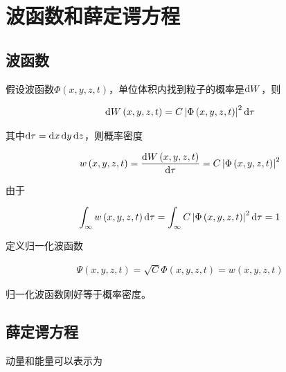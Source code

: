 \section{波函数和薛定谔方程}

\subsection{波函数}

假设波函数$\Phi(x,y,z,t)$，单位体积内找到粒子的概率是$\mathop{}\!\mathrm{d} W$，则

\begin{equation*}
  \begin{aligned}
    \mathop{}\!\mathrm{d} W \left( x, y, z, t \right) = C \left| \Phi \left( x, y, z, t \right) \right|^2 \mathop{}\!\mathrm{d} \tau
  \end{aligned}
\end{equation*}

其中$\mathop{}\!\mathrm{d} \tau = \mathop{}\!\mathrm{d} x \mathop{}\!\mathrm{d} y \mathop{}\!\mathrm{d} z$，则概率密度

\begin{equation*}
  \begin{aligned}
    w \left( x, y, z, t \right) = \dfrac{\mathop{}\!\mathrm{d} W \left( x, y, z, t \right)}{\mathop{}\!\mathrm{d} \tau} = C \left| \Phi \left( x, y, z, t \right) \right|^2
  \end{aligned}
\end{equation*}

由于

\begin{equation*}
  \begin{aligned}
    \int_{\infty} w \left( x, y, z, t \right) \mathop{}\!\mathrm{d} \tau = \int_{\infty} C \left| \Phi \left( x, y, z, t \right) \right|^2 \mathop{}\!\mathrm{d} \tau = 1
  \end{aligned}
\end{equation*}

定义归一化波函数

\begin{equation*}
  \begin{aligned}
    \Psi \left( x, y, z, t \right) = \sqrt{C} \Phi \left( x, y, z, t \right) = w \left( x, y, z, t \right)
  \end{aligned}
\end{equation*}

归一化波函数刚好等于概率密度。

\subsection{薛定谔方程}

动量和能量可以表示为

